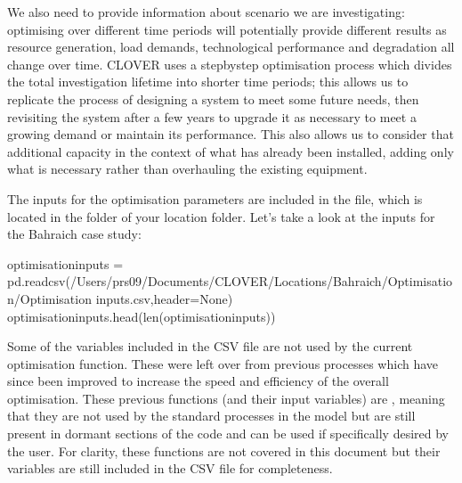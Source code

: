 \documentclass[letterpaper,10pt,english]{sphinxmanual}
\begin{document}
\sphinxAtStartPar
We also need to provide information about scenario we are investigating:
optimising over different time periods will potentially provide
different results as resource generation, load demands, technological
performance and degradation all change over time. CLOVER uses a
step\sphinxhyphen{}by\sphinxhyphen{}step optimisation process which divides the total investigation
lifetime into shorter time periods; this allows us to replicate the
process of designing a system to meet some future needs, then revisiting
the system after a few years to upgrade it as necessary to meet a
growing demand or maintain its performance. This also allows us to
consider that additional capacity in the context of what has already
been installed, adding only what is necessary rather than overhauling
the existing equipment.

\sphinxAtStartPar
The inputs for the optimisation parameters are included in the
 file, which is located in the 
folder of your location folder. Let’s take a look at the inputs for the
Bahraich case study:

\begin{sphinxVerbatim}[commandchars=\\\{\}]
optimisation\PYGZus{}inputs = pd.read\PYGZus{}csv(\PYGZdq{}/Users/prs09/Documents/CLOVER/Locations/Bahraich/Optimisation/Optimisation inputs.csv\PYGZdq{},header=None)
optimisation\PYGZus{}inputs.head(len(optimisation\PYGZus{}inputs))
\end{sphinxVerbatim}



\begin{DUlineblock}{0em}
\item[] 
\end{DUlineblock}

\sphinxAtStartPar
Some of the variables included in the  CSV file
are not used by the current optimisation function. These were left over
from previous processes which have since been improved to increase the
speed and efficiency of the overall optimisation. These previous
functions (and their input variables) are , meaning that
they are not used by the standard processes in the model but are still
present in dormant sections of the code and can be used if specifically
desired by the user. For clarity, these functions are not covered in
this document but their variables are still included in the
 CSV file for completeness.
\end{document}
